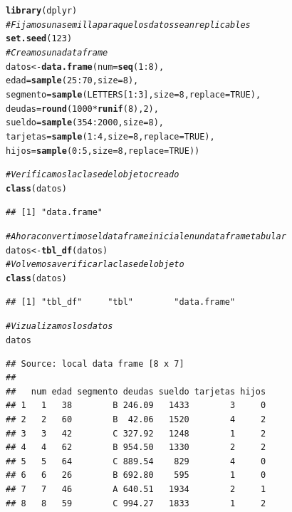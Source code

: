 \documentclass[11pt,a4paper,oneside]{book}\usepackage[]{graphicx}\usepackage[]{color}
\makeatletter
\newcommand{\hlnum}[1]{\textcolor[rgb]{0.686,0.059,0.569}{#1}}%
\newcommand{\hlcom}[1]{\textcolor[rgb]{0.678,0.584,0.686}{\textit{#1}}}%
\newcommand{\hlopt}[1]{\textcolor[rgb]{0,0,0}{#1}}%
\newcommand{\hlstd}[1]{\textcolor[rgb]{0.345,0.345,0.345}{#1}}%
\newcommand{\hlkwb}[1]{\textcolor[rgb]{0.69,0.353,0.396}{#1}}%
\newcommand{\hlkwc}[1]{\textcolor[rgb]{0.333,0.667,0.333}{#1}}%
\newcommand{\hlkwd}[1]{\textcolor[rgb]{0.737,0.353,0.396}{\textbf{#1}}}%
\newenvironment{kframe}{%
 \def\at@end@of@kframe{}%
 \ifinner\ifhmode%
  \def\at@end@of@kframe{\end{minipage}}%
  \begin{minipage}{\columnwidth}%
 \fi\fi%
 \def\FrameCommand##1{\hskip\@totalleftmargin \hskip-\fboxsep
 \colorbox{shadecolor}{##1}\hskip-\fboxsep
     \hskip-\linewidth \hskip-\@totalleftmargin \hskip\columnwidth}%
 \MakeFramed {\advance\hsize-\width
   \@totalleftmargin\z@ \linewidth\hsize
   \@setminipage}}%
 {\par\unskip\endMakeFramed%
 \at@end@of@kframe}
\newenvironment{knitrout}{}{} %
\makeatother
\begin{document}
\begin{itemize}
\begin{knitrout}
\color{fgcolor}\begin{kframe}
\begin{alltt}
\hlkwd{library}\hlstd{(dplyr)}
\hlcom{# Fijamos una semilla para que los datos sean replicables}
\hlkwd{set.seed}\hlstd{(}\hlnum{123}\hlstd{)}
\hlcom{# Creamos una data frame}
\hlstd{datos} \hlkwb{<-} \hlkwd{data.frame}\hlstd{(}\hlkwc{num}\hlstd{=}\hlkwd{seq}\hlstd{(}\hlnum{1}\hlopt{:}\hlnum{8}\hlstd{),}
                   \hlkwc{edad}\hlstd{=}\hlkwd{sample}\hlstd{(}\hlnum{25}\hlopt{:}\hlnum{70}\hlstd{,} \hlkwc{size}\hlstd{=}\hlnum{8}\hlstd{),}
                   \hlkwc{segmento}\hlstd{=}\hlkwd{sample}\hlstd{(LETTERS[}\hlnum{1}\hlopt{:}\hlnum{3}\hlstd{],} \hlkwc{size}\hlstd{=}\hlnum{8}\hlstd{,} \hlkwc{replace}\hlstd{=}\hlnum{TRUE}\hlstd{),}
                   \hlkwc{deudas}\hlstd{=}\hlkwd{round}\hlstd{(}\hlnum{1000}\hlopt{*}\hlkwd{runif}\hlstd{(}\hlnum{8}\hlstd{),}\hlnum{2}\hlstd{),}
                   \hlkwc{sueldo}\hlstd{=}\hlkwd{sample}\hlstd{(}\hlnum{354}\hlopt{:}\hlnum{2000}\hlstd{,} \hlkwc{size}\hlstd{=}\hlnum{8}\hlstd{),}
                   \hlkwc{tarjetas}\hlstd{=}\hlkwd{sample}\hlstd{(}\hlnum{1}\hlopt{:}\hlnum{4}\hlstd{,} \hlkwc{size}\hlstd{=}\hlnum{8}\hlstd{,} \hlkwc{replace}\hlstd{=}\hlnum{TRUE}\hlstd{),}
                   \hlkwc{hijos}\hlstd{=}\hlkwd{sample}\hlstd{(}\hlnum{0}\hlopt{:}\hlnum{5}\hlstd{,} \hlkwc{size}\hlstd{=}\hlnum{8}\hlstd{,} \hlkwc{replace}\hlstd{=}\hlnum{TRUE}\hlstd{))}

\hlcom{# Verificamos la clase del objeto creado}
\hlkwd{class}\hlstd{(datos)}
\end{alltt}
\begin{verbatim}
## [1] "data.frame"
\end{verbatim}
\begin{alltt}
\hlcom{# Ahora convertimos el data frame inicial en un data frame tabular}
\hlstd{datos} \hlkwb{<-} \hlkwd{tbl_df}\hlstd{(datos)}
\hlcom{# Volvemos a verificar la clase del objeto}
\hlkwd{class}\hlstd{(datos)}
\end{alltt}
\begin{verbatim}
## [1] "tbl_df"     "tbl"        "data.frame"
\end{verbatim}
\begin{alltt}
\hlcom{# Vizualizamos los datos}
\hlstd{datos}
\end{alltt}
\begin{verbatim}
## Source: local data frame [8 x 7]
## 
##   num edad segmento deudas sueldo tarjetas hijos
## 1   1   38        B 246.09   1433        3     0
## 2   2   60        B  42.06   1520        4     2
## 3   3   42        C 327.92   1248        1     2
## 4   4   62        B 954.50   1330        2     2
## 5   5   64        C 889.54    829        4     0
## 6   6   26        B 692.80    595        1     0
## 7   7   46        A 640.51   1934        2     1
## 8   8   59        C 994.27   1833        1     2
\end{verbatim}
\end{kframe}
\end{knitrout}


\end{itemize}
\end{document}
